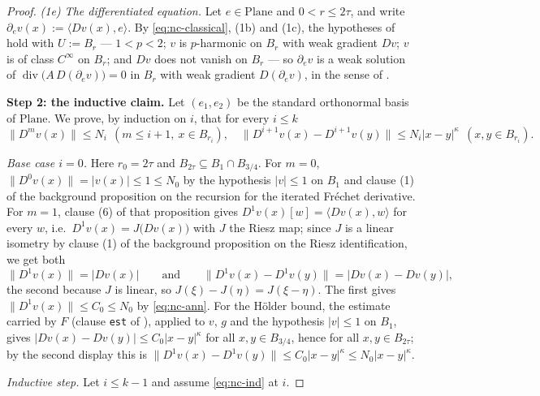 \begin{proof}
\emph{(1e) The differentiated equation.}  Let $e\in\mathrm{Plane}$ and $0<r\le2\tau$, and write
$\partial_ev(x):=\langle Dv(x),e\rangle$.  By \eqref{eq:nc-classical}, (1b) and (1c), the
hypotheses of  hold with $U:=B_r$ --- $1<p<2$; $v$ is $p$-harmonic on
$B_r$ with weak gradient $Dv$; $v$ is of class $C^{\infty}$ on $B_r$; and $Dv$ does not vanish
on $B_r$ --- so $\partial_ev$ is a weak solution of
$\operatorname{div}\bigl(A\,D(\partial_ev)\bigr)=0$ in $B_r$ with weak gradient
$D(\partial_ev)$, in the sense of .

\medskip\noindent\textbf{Step 2: the inductive claim.}
Let $(e_1,e_2)$ be the standard orthonormal basis of $\mathrm{Plane}$.  We prove, by induction
on $i$, that for every $i\le k$
\begin{equation}\label{eq:nc-ind}
  \bigl\lVert D^{m}v(x)\bigr\rVert\le N_i\ \ (m\le i+1,\ x\in B_{r_i}),
  \quad
  \bigl\lVert D^{i+1}v(x)-D^{i+1}v(y)\bigr\rVert\le N_i\lvert x-y\rvert^{\kappa}
  \ \ (x,y\in B_{r_i}).
\end{equation}

\emph{Base case $i=0$.}  Here $r_0=2\tau$ and $B_{2\tau}\subseteq B_1\cap B_{3/4}$.  For $m=0$,
$\lVert D^{0}v(x)\rVert=\lvert v(x)\rvert\le1\le N_0$ by the hypothesis $\lvert v\rvert\le1$ on
$B_1$ and clause (1) of the background proposition on the recursion for the iterated Fr\'echet
derivative.  For $m=1$, clause (6) of that proposition gives
$D^{1}v(x)[w]=\langle Dv(x),w\rangle$ for every $w$, i.e.\ $D^{1}v(x)=J\bigl(Dv(x)\bigr)$ with
$J$ the Riesz map; since $J$ is a linear isometry by clause (1) of the background proposition on
the Riesz identification, we get both
\[
  \bigl\lVert D^{1}v(x)\bigr\rVert=\lvert Dv(x)\rvert
  \qquad\text{and}\qquad
  \bigl\lVert D^{1}v(x)-D^{1}v(y)\bigr\rVert=\lvert Dv(x)-Dv(y)\rvert ,
\]
the second because $J$ is linear, so $J(\xi)-J(\eta)=J(\xi-\eta)$.  The first gives
$\lVert D^{1}v(x)\rVert\le C_0\le N_0$ by \eqref{eq:nc-ann}.  For the H\"older bound, the
estimate carried by $F$ (clause \texttt{est} of ), applied to
$v$, $g$ and the hypothesis $\lvert v\rvert\le1$ on $B_1$, gives
$\lvert Dv(x)-Dv(y)\rvert\le C_0\lvert x-y\rvert^{\kappa}$ for all $x,y\in B_{3/4}$, hence for
all $x,y\in B_{2\tau}$; by the second display this is
$\lVert D^{1}v(x)-D^{1}v(y)\rVert\le C_0\lvert x-y\rvert^{\kappa}\le N_0\lvert
x-y\rvert^{\kappa}$.

\emph{Inductive step.}  Let $i\le k-1$ and assume \eqref{eq:nc-ind} at $i$.


\end{proof}
